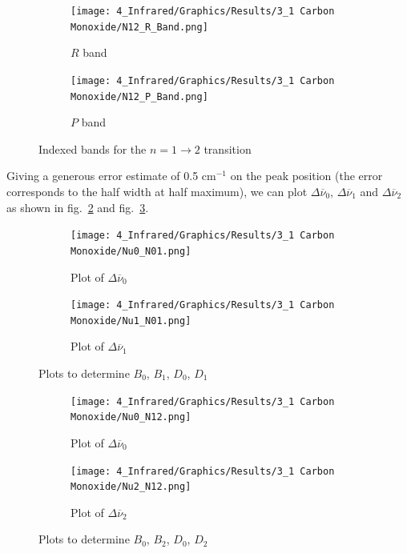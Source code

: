 \documentclass[12pt]{article}
\begin{document}
\begin{figure}[!ht]
    \centering
    \begin{subfigure}[c]{0.49\textwidth}
        \centering
        \texttt{[image: 4\_Infrared/Graphics/Results/3\_1 Carbon Monoxide/N12\_R\_Band.png]}
        \caption{$R$ band}
    \end{subfigure}
    \hfill
    \begin{subfigure}[c]{0.49\textwidth}
        \centering
        \texttt{[image: 4\_Infrared/Graphics/Results/3\_1 Carbon Monoxide/N12\_P\_Band.png]}
        \caption{$P$ band}
    \end{subfigure}
    \caption{Indexed bands for the $n = 1 \rightarrow 2$ transition}
    \label{fig:IndexedBandsN12}
\end{figure}
\FloatBarrier

Giving a generous error estimate of 0.5 cm$^{-1}$ on the peak position (the error corresponds to the half width at half maximum), we can plot $\Delta \overline{\nu}_0$, $\Delta \overline{\nu}_1$ and $\Delta \overline{\nu}_2$ as shown in fig.~\ref{fig:LinearFitsNuN01} and fig.~\ref{fig:LinearFitsNuN12}.
\begin{figure}[!ht]
    \centering
    \begin{subfigure}[c]{0.49\textwidth}
        \centering
        \texttt{[image: 4\_Infrared/Graphics/Results/3\_1 Carbon Monoxide/Nu0\_N01.png]}
        \caption{Plot of $\Delta \overline{\nu}_0$}
    \end{subfigure}
    \hfill
    \begin{subfigure}[c]{0.49\textwidth}
        \centering
        \texttt{[image: 4\_Infrared/Graphics/Results/3\_1 Carbon Monoxide/Nu1\_N01.png]}
        \caption{Plot of $\Delta \overline{\nu}_1$}
    \end{subfigure}
    \caption{Plots to determine $B_0$, $B_1$, $D_0$, $D_1$}
    \label{fig:LinearFitsNuN01}
\end{figure}
\FloatBarrier

\begin{figure}[!ht]
    \centering
    \begin{subfigure}[c]{0.49\textwidth}
        \centering
        \texttt{[image: 4\_Infrared/Graphics/Results/3\_1 Carbon Monoxide/Nu0\_N12.png]}
        \caption{Plot of $\Delta \overline{\nu}_0$}
    \end{subfigure}
    \hfill
    \begin{subfigure}[c]{0.49\textwidth}
        \centering
        \texttt{[image: 4\_Infrared/Graphics/Results/3\_1 Carbon Monoxide/Nu2\_N12.png]}
        \caption{Plot of $\Delta \overline{\nu}_2$}
    \end{subfigure}
    \caption{Plots to determine $B_0$, $B_2$, $D_0$, $D_2$}
    \label{fig:LinearFitsNuN12}
\end{figure}
\FloatBarrier
\end{document}
